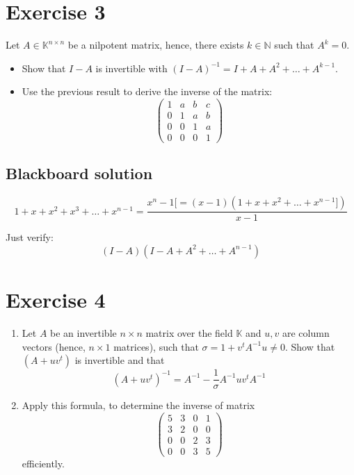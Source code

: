 \documentclass[a4paper]{article}
\theoremstyle{definition}
\begin{document}
\section*{Exercise 3}
\begin{ex}
  Let $A \in \mathbb K^{n\times n}$ be a nilpotent matrix, hence, there exists $k \in \mathbb N$ such that $A^k = 0$.
  \begin{itemize}
    \item Show that $I - A$ is invertible with $(I - A)^{-1} = I + A + A^2 + \dots + A^{k-1}$.
    \item Use the previous result to derive the inverse of the matrix:
      \[
        \begin{pmatrix}
          1 & a & b & c \\
          0 & 1 & a & b \\
          0 & 0 & 1 & a \\
          0 & 0 & 0 & 1
        \end{pmatrix}
      \]
  \end{itemize}
\end{ex}

\subsection{Blackboard solution}

\[ 1 + x + x^2 + x^3 + \dots + x^{n-1} = \frac{x^n - 1 [= (x-1)(1 + x + x^2 + \dots + x^{n-1}])}{x-1} \]

Just verify:
\[ (I - A)(I - A + A^2 + \dots + A^{n-1}) \]

\section*{Exercise 4}
\begin{ex}
  \begin{enumerate}
    \item Let $A$ be an invertible $n \times n$ matrix over the field $\mathbb K$ and $u,v$ are column vectors (hence, $n\times 1$ matrices),
          such that $\sigma = 1 + v^t A^{-1} u \neq 0$. Show that $(A + uv^t)$ is invertible and that
          \[ (A + uv^t)^{-1} = A^{-1} - \frac1\sigma A^{-1} uv^t A^{-1} \]
    \item Apply this formula, to determine the inverse of matrix
          \[
            \begin{pmatrix}
              5 & 3 & 0 & 1 \\
              3 & 2 & 0 & 0 \\
              0 & 0 & 2 & 3 \\
              0 & 0 & 3 & 5
            \end{pmatrix}
          \]
          efficiently.
  \end{enumerate}
\end{ex}
\end{document}
